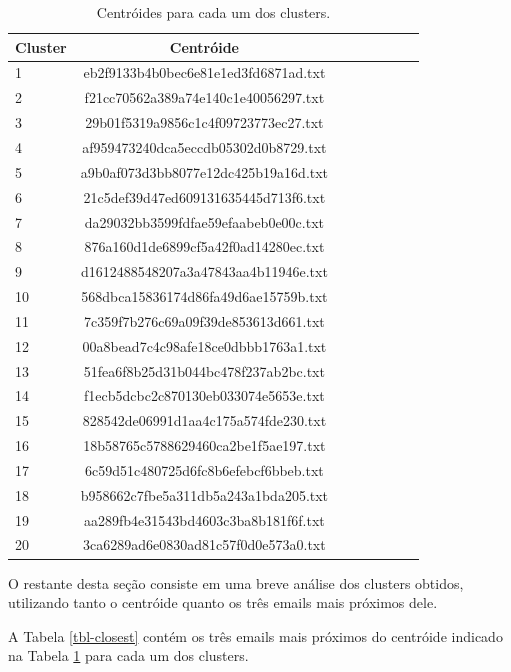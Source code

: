 \documentclass[10pt,twocolumn,letterpaper]{article}
\begin{document}
\begin{table}
\begin{center}
\begin{tabular}{l*{6}{c}r}
Cluster & Centróide \\
\hline
1 & eb2f9133b4b0bec6e81e1ed3fd6871ad.txt \\
2 & f21cc70562a389a74e140c1e40056297.txt  \\
3 & 29b01f5319a9856c1c4f09723773ec27.txt  \\
4 & af959473240dca5eccdb05302d0b8729.txt \\
5 & a9b0af073d3bb8077e12dc425b19a16d.txt \\
6 & 21c5def39d47ed609131635445d713f6.txt \\
7 & da29032bb3599fdfae59efaabeb0e00c.txt  \\
8 & 876a160d1de6899cf5a42f0ad14280ec.txt  \\
9 & d1612488548207a3a47843aa4b11946e.txt  \\
10 & 568dbca15836174d86fa49d6ae15759b.txt  \\
11 & 7c359f7b276c69a09f39de853613d661.txt  \\
12 & 00a8bead7c4c98afe18ce0dbbb1763a1.txt  \\
13 & 51fea6f8b25d31b044bc478f237ab2bc.txt  \\
14 & f1ecb5dcbc2c870130eb033074e5653e.txt \\
15 & 828542de06991d1aa4c175a574fde230.txt  \\
16 & 18b58765c5788629460ca2be1f5ae197.txt  \\
17 & 6c59d51c480725d6fc8b6efebcf6bbeb.txt   \\
18 & b958662c7fbe5a311db5a243a1bda205.txt  \\
19 & aa289fb4e31543bd4603c3ba8b181f6f.txt  \\
20 & 3ca6289ad6e0830ad81c57f0d0e573a0.txt  \\
\end{tabular}
\end{center}
\caption{Centróides para cada um dos clusters.}
\label{tbl-centroids}
\end{table}

O restante desta seção consiste em uma breve análise dos clusters obtidos, utilizando tanto o centróide quanto os três emails mais próximos dele.

A Tabela \ref{tbl-closest} contém os três emails mais próximos do centróide indicado na Tabela \ref{tbl-centroids} para cada um dos clusters.
\end{document}
